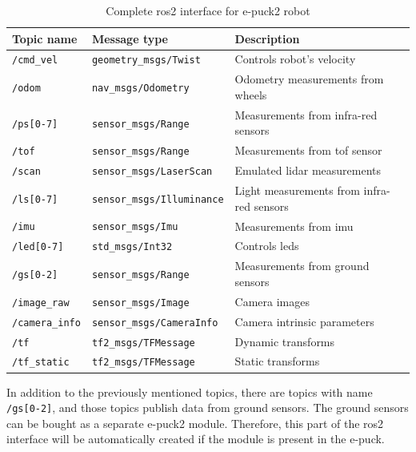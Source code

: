 \begin{table}[H]
    \begin{adjustwidth}{-1.5in}{-1.5in}
    \centering
    \begin{tabular}{|l|l|l|}
        \hline
        \textbf{Topic name} & \textbf{Message type} & \textbf{Description} \\
        \hline
        \texttt{/cmd\_vel} & \texttt{geometry\_msgs/Twist} & Controls robot's velocity \\
        \hline
        \texttt{/odom} & \texttt{nav\_msgs/Odometry} & Odometry measurements from wheels \\
        \hline
        \texttt{/ps[0-7]} & \texttt{sensor\_msgs/Range} & Measurements from infra-red sensors \\
        \hline
        \texttt{/tof} & \texttt{sensor\_msgs/Range} & Measurements from \acs{tof} sensor \\
        \hline
        \texttt{/scan} & \texttt{sensor\_msgs/LaserScan} & Emulated \ac{lidar} measurements \\
        \hline
        \texttt{/ls[0-7]} & \texttt{sensor\_msgs/Illuminance} & Light measurements from infra-red sensors \\
        \hline
        \texttt{/imu} & \texttt{sensor\_msgs/Imu} & Measurements from \acs{imu} \\
        \hline
        \texttt{/led[0-7]} & \texttt{std\_msgs/Int32} & Controls \acsp{led} \\
        \hline
        \texttt{/gs[0-2]} & \texttt{sensor\_msgs/Range} & Measurements from ground sensors \\
        \hline
        \texttt{/image\_raw} & \texttt{sensor\_msgs/Image} & Camera images \\
        \hline
        \texttt{/camera\_info} & \texttt{sensor\_msgs/CameraInfo} & Camera intrinsic parameters \\
        \hline
        \texttt{/tf} & \texttt{tf2\_msgs/TFMessage} & Dynamic transforms \\
        \hline
        \texttt{/tf\_static} & \texttt{tf2\_msgs/TFMessage} & Static transforms \\
        \hline
    \end{tabular}
    \caption{Complete \ac{ros2} interface for e-puck2 robot}
    \label{tab:simulation:complete_interface}
    \end{adjustwidth}
\end{table}

In addition to the previously mentioned topics, there are topics with name \texttt{/gs[0-2]}, and those topics publish data from ground sensors.
The ground sensors can be bought as a separate e-puck2 module.
Therefore, this part of the \ac{ros2} interface will be automatically created if the module is present in the e-puck.

